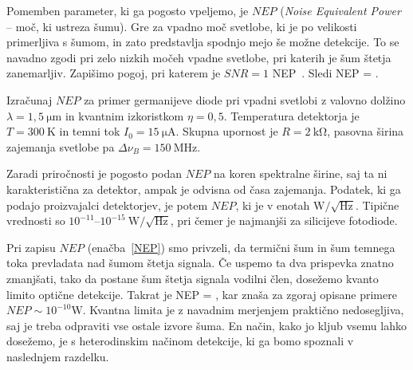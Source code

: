 Pomemben parameter, ki ga pogosto vpeljemo, je $NEP$ ({\it Noise Equivalent Power} -- 
moč, ki ustreza šumu). Gre za vpadno moč svetlobe, ki je po velikosti primerljiva 
s šumom, in zato predstavlja spodnjo mejo še možne detekcije. To se navadno zgodi 
pri zelo nizkih močeh vpadne svetlobe, pri katerih je šum štetja zanemarljiv.
Zapišimo pogoj, pri katerem je $SNR=1$
\beq
NEP\,  \eta \approx {}.
\eeq
Sledi
\beq
NEP = .
\label{NEP}
\eeq
\begin{definition}
Izračunaj $NEP$ za primer germanijeve diode pri vpadni svetlobi z valovno dolžino
$\lambda = 1,5~\si{\micro\meter}$ in kvantnim izkoristkom $\eta=0,5$. Temperatura detektorja
je $T=300~\si{\kelvin}$ in temni tok $I_0=15~\si{\micro\ampere}$. Skupna upornost
je $R=2~\si{\kilo\ohm}$, pasovna širina zajemanja svetlobe pa 
$\Delta\nu_B=150~\si{\mega\hertz}$.
\end{definition}

\begin{remark}
Zaradi priročnosti je pogosto podan $NEP$ na koren spektralne širine, saj ta ni 
karakteristična za detektor, ampak je odvisna od časa zajemanja. Podatek, ki 
ga podajo proizvajalci detektorjev, je potem $NEP$, ki je v enotah 
$\si{\watt}/\sqrt{\si{\hertz}}$. Tipične vrednosti so 
$10^{-11}$--$10^{-15}~\si{\watt}/\sqrt{\si{\hertz}}$, pri čemer je najmanjši
za silicijeve fotodiode. 
\end{remark}

Pri zapisu $NEP$ (enačba~\ref{NEP}) smo privzeli, da termični šum in šum temnega
toka prevladata nad šumom štetja signala. Če uspemo ta dva prispevka znatno 
zmanjšati, tako da postane šum štetja signala vodilni člen, 
dosežemo kvanto limito optične detekcije. Takrat je 
\beq
NEP = ,
\eeq
kar znaša za zgoraj opisane primere $NEP \sim 10^{-10}\si{\watt}$. Kvantna limita
je z navadnim merjenjem praktično nedosegljiva, saj je treba odpraviti vse ostale izvore 
šuma. En način, kako jo kljub vsemu lahko dosežemo, je s heterodinskim načinom
detekcije, ki ga bomo spoznali v naslednjem razdelku.

